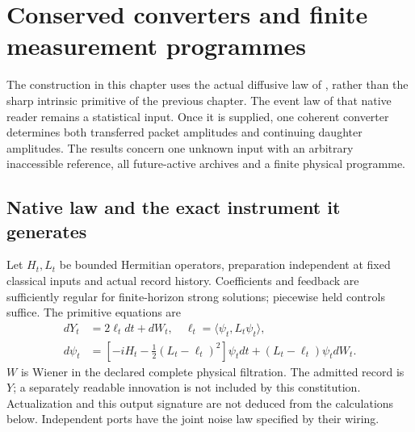 \documentclass[11pt,oneside,openany]{book}
\theoremstyle{definition}
\theoremstyle{remark}\newtheorem{remark}[theorem]{Remark}
\begin{document}
\chapter{Conserved converters and finite measurement programmes}
\label{det:chapter-instruments}

The construction in this chapter uses the actual diffusive law of
\cite{M12}, rather than the sharp intrinsic primitive of the previous
chapter. The event law of that native reader remains a statistical
input. Once it is supplied, one coherent converter determines both
transferred packet amplitudes and continuing daughter amplitudes.
The results concern one unknown input with an arbitrary inaccessible
reference, all future-active archives and a finite physical programme.

\section{Native law and the exact instrument it generates}

Let $H_t,L_t$ be bounded Hermitian operators, preparation independent
at fixed classical inputs and actual record history. Coefficients and
feedback are sufficiently regular for finite-horizon strong solutions;
piecewise held controls suffice. The primitive equations are
\begin{align}
 dY_t&=2\ell_tdt+dW_t,\quad
        \ell_t=\langle\psi_t,L_t\psi_t\rangle,\nonumber\\
 d\psi_t&=\left[-iH_t-\tfrac12(L_t-\ell_t)^2\right]\psi_tdt
                  +(L_t-\ell_t)\psi_tdW_t.       \label{det:native}
\end{align}
$W$ is Wiener in the declared complete physical filtration. The
admitted record is $Y$; a separately readable innovation is not included
by this constitution. Actualization and this output signature are not
deduced from the calculations below. Independent ports have the joint
noise law specified by their wiring.
\end{document}
